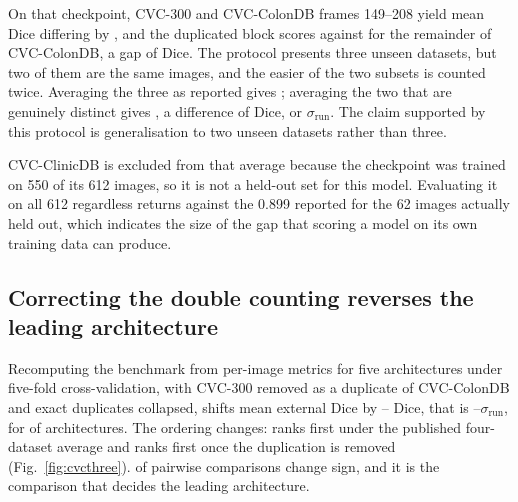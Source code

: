 \documentclass[11pt]{article}
\begin{document}
On that checkpoint, CVC-300 and CVC-ColonDB frames 149--208 yield mean Dice
differing by \PraNetBlockDiff{}, and the duplicated block scores
\PraNetBlock{} against \PraNetRest{} for the remainder of CVC-ColonDB, a gap
of \PraNetBlockGap{} Dice. The protocol presents three unseen datasets, but
two of them are the same images, and the easier of the two subsets is counted
twice. Averaging the three as reported gives \PraNetAvgThree{}; averaging the
two that are genuinely distinct gives \PraNetAvgTwo{}, a difference of
\PraNetShift{} Dice, or \PraNetShiftSigma$\sigma_{\mathrm{run}}$. The claim
supported by this protocol is generalisation to two unseen datasets rather
than three.

CVC-ClinicDB is excluded from that average because the checkpoint was trained
on 550 of its 612 images, so it is not a held-out set for this model.
Evaluating it on all 612 regardless returns \PraNetClinicAll{} against the
\num{0.899} reported for the 62 images actually held out, which indicates the
size of the gap that scoring a model on its own training data can produce.

\begin{table}[t]\centering
\caption{\textbf{Measured consequences, in Dice and in units of the
run-to-run noise floor} $\sigma_{\mathrm{run}} = \SigmaRun{}$. Negative
values indicate that the corrected figure is lower than the reported one.
The position prior is an absolute score rather than a difference, so no
noise-floor ratio is given.}
\label{tab:effects}
\small

\end{table}

\subsection*{Correcting the double counting reverses the leading architecture}

Recomputing the benchmark from per-image metrics for five architectures under
five-fold cross-validation, with CVC-300 removed as a duplicate of
CVC-ColonDB and exact duplicates collapsed, shifts mean external Dice by
\RescoreMinShift--\RescoreMaxShift{} Dice, that is
\RescoreMinSigma--\RescoreMaxSigma$\sigma_{\mathrm{run}}$, for
\RescoreNShifted{} of \RescoreNModels{} architectures. The ordering changes:
\TopPublished{} ranks first under the published four-dataset average and
\TopCorrected{} ranks first once the duplication is removed
(Fig.~\ref{fig:cvcthree}). \NSignFlips{} of \NPairs{} pairwise comparisons
change sign, and it is the comparison that decides the leading architecture.
\end{document}
